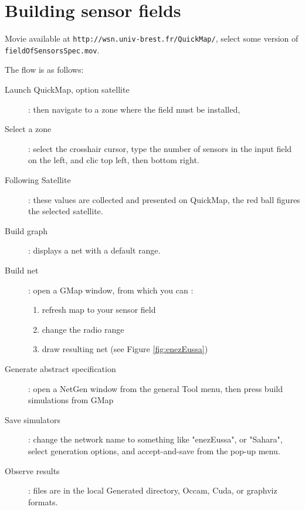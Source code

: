 \section{Building sensor fields}

Movie available at  {\tt http://wsn.univ-brest.fr/QuickMap/}, select some version of {\tt fieldOfSensorsSpec.mov}.

The flow is as follows:

\begin{description}
\item [Launch QuickMap, option satellite] : then navigate to a zone where the field must be installed,
\item [Select a zone ]: select the crosshair cursor, type the number of sensors in the input field on the left, and clic top left, then bottom right.
\item [Following Satellite ]: these values are collected and presented on QuickMap, the red ball figures the selected satellite.
\item [Build graph ]:  displays a net with a default range.
\item [Build net ]:  open a GMap window, from which you can :
\begin{enumerate}
\item refresh map to your sensor field
\item change the radio range
\item draw resulting net (see Figure \ref{fig:enezEussa})
\end{enumerate}
\item [Generate abstract specification ]: open a NetGen window from the general Tool menu, then press build simulations from GMap
\item [Save simulators ]: change the network name to something like "enezEussa", or "Sahara", select generation options, and accept-and-save from the pop-up menu.
\item [Observe results ]:  files are in the local Generated directory, Occam, Cuda, or graphviz formats.
\end{description}



